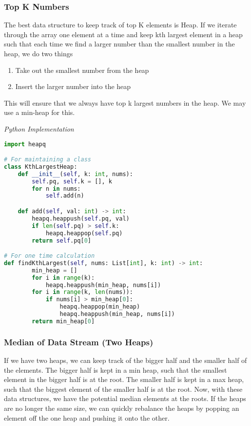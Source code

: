 \documentclass{article}
\begin{document}
    \subsubsection{Top K Numbers}
    The best data structure to keep track of top K elements is Heap. If we iterate through the array one element at a time and keep kth largest element in a heap such that each time we find a larger number than the smallest number in the heap, we do two things
    \begin{enumerate}
        \item Take out the smallest number from the heap
        \item Insert the larger number into the heap
    \end{enumerate}
    This will ensure that we always have top k largest numbers in the heap. We may use a min-heap for this.

\vspace{8pt} \emph{Python Implementation}
\begin{lstlisting}[language=Python]
import heapq

# For maintaining a class
class KthLargestHeap:
    def __init__(self, k: int, nums):
        self.pq, self.k = [], k
        for n in nums:
            self.add(n)

    def add(self, val: int) -> int:
        heapq.heappush(self.pq, val)
        if len(self.pq) > self.k:
            heapq.heappop(self.pq)
        return self.pq[0]

# For one time calculation
def findKthLargest(self, nums: List[int], k: int) -> int:
        min_heap = []
        for i in range(k):
            heapq.heappush(min_heap, nums[i])
        for i in range(k, len(nums)):
            if nums[i] > min_heap[0]:
                heapq.heappop(min_heap)
                heapq.heappush(min_heap, nums[i])
        return min_heap[0]
\end{lstlisting}

    
    \subsubsection{Median of Data Stream (Two Heaps)}
    If we have two heaps, we can keep track of the bigger half and the smaller half of the elements. The bigger half is kept in a min heap, such that the smallest element in the bigger half is at the root. The smaller half is kept in a max heap, such that the biggest element of the smaller half is at the root. Now, with these data structures, we have the potential median elements at the roots. If the heaps are no longer the same size, we can quickly rebalance the heaps by popping an element off the one heap and pushing it onto the other.
\end{document}
